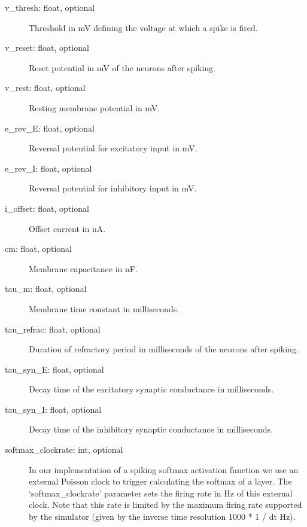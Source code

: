 \documentclass[letterpaper,10pt,english]{sphinxmanual}
\begin{document}
\label{configure_toolbox:cell-parameters}\begin{description}
\item[{v\_thresh: float, optional}] \leavevmode
Threshold in mV defining the voltage at which a spike is fired.

\item[{v\_reset: float, optional}] \leavevmode
Reset potential in mV of the neurons after spiking.

\item[{v\_rest: float, optional}] \leavevmode
Resting membrane potential in mV.

\item[{e\_rev\_E: float, optional}] \leavevmode
Reversal potential for excitatory input in mV.

\item[{e\_rev\_I: float, optional}] \leavevmode
Reversal potential for inhibitory input in mV.

\item[{i\_offset: float, optional}] \leavevmode
Offset current in nA.

\item[{cm: float, optional}] \leavevmode
Membrane capacitance in nF.

\item[{tau\_m: float, optional}] \leavevmode
Membrane time constant in milliseconds.

\item[{tau\_refrac: float, optional}] \leavevmode
Duration of refractory period in milliseconds of the neurons after spiking.

\item[{tau\_syn\_E: float, optional}] \leavevmode
Decay time of the excitatory synaptic conductance in milliseconds.

\item[{tau\_syn\_I: float, optional}] \leavevmode
Decay time of the inhibitory synaptic conductance in milliseconds.

\item[{softmax\_clockrate: int, optional}] \leavevmode
In our implementation of a spiking softmax activation function we use an
external Poisson clock to trigger calculating the softmax of a layer. The
`softmax\_clockrate' parameter sets the firing rate in Hz of this external
clock. Note that this rate is limited by the maximum firing rate supported
by the simulator (given by the inverse time resolution 1000 * 1 / dt Hz).

\end{description}
\end{document}
